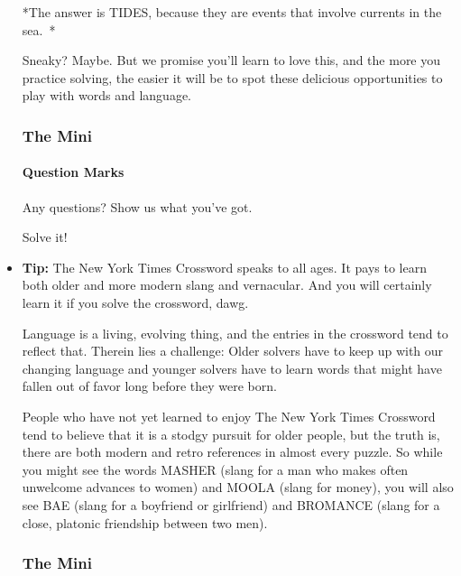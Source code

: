 \begin{itemize}
  *The answer is TIDES, because they are events that involve currents in
  the sea.~*

  Sneaky? Maybe. But we promise you'll learn to love this, and the more
  you practice solving, the easier it will be to spot these delicious
  opportunities to play with words and language.

  \hypertarget{the-mini-9}{%
  \subsubsection{The Mini}\label{the-mini-9}}

  \href{https://www.nytimes.com/crosswords/game/special/question-mark}{}

  \hypertarget{question-marks}{%
  \paragraph{Question Marks}\label{question-marks}}

  Any questions? Show us what you've got.

  Solve it!
\item
  \textbf{Tip:} The New York Times Crossword speaks to all ages. It pays
  to learn both older and more modern slang and vernacular. And you will
  certainly learn it if you solve the crossword, dawg.

  Language is a living, evolving thing, and the entries in the crossword
  tend to reflect that. Therein lies a challenge: Older solvers have to
  keep up with our changing language and younger solvers have to learn
  words that might have fallen out of favor long before they were born.

  People who have not yet learned to enjoy The New York Times Crossword
  tend to believe that it is a stodgy pursuit for older people, but the
  truth is, there are both modern and retro references in almost every
  puzzle. So while you might see the words MASHER (slang for a man who
  makes often unwelcome advances to women) and MOOLA (slang for money),
  you will also see BAE (slang for a boyfriend or girlfriend) and
  BROMANCE (slang for a close, platonic friendship between two men).

  \hypertarget{the-mini-10}{%
  \subsubsection{The Mini}\label{the-mini-10}}

  \href{https://www.nytimes.com/crosswords/game/special/slang}{}


\end{itemize}
